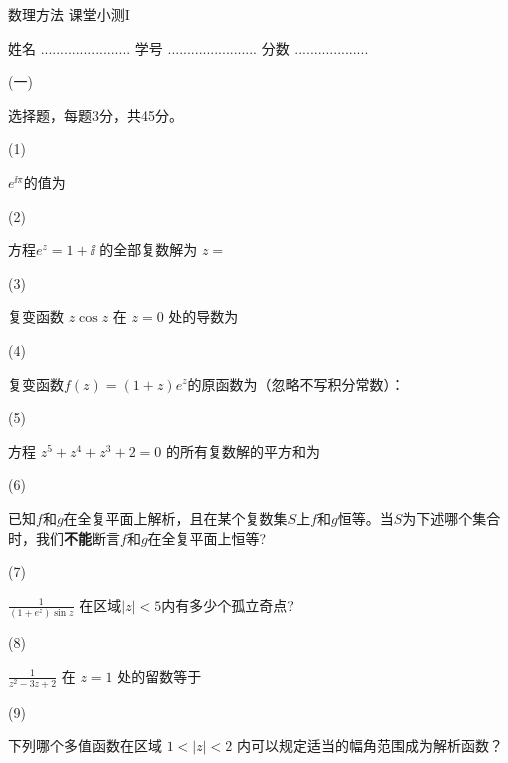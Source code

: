 \documentclass[12pt,CJK]{article}
\begin{document}
\bch
{\large 数理方法 课堂小测I}

{\vskip 0.2in}

姓名 ....................... {\hskip 0.5in}    学号 .......................{\hskip 0.5in}  分数 ...................

\bitem
\item[(一)]{选择题，每题3分，共45分。

  \bitem
\item[(1)]{ $e^{\ii \pi}$的值为  \bropt
  
   }
\item[(2)]{方程$e^z = 1 +\ii$ 的全部复数解为 $z=$ \bropt


}


\item[(3)]{复变函数 $z\cos z$ 在 $z=0$ 处的导数为 \bropt
  
  }

\item[(4)]{复变函数$f(z) = (1+z)e^z$的原函数为（忽略不写积分常数）： \bropt

  }
\item[(5)]{方程 $z^5+ z^4+z^3+2=0$ 的所有复数解的平方和为 \bropt

  }  

\item[(6)]{已知$f$和$g$在全复平面上解析，且在某个复数集$S$上$f$和$g$恒等。当$S$为下述哪个集合时，我们{\bf 不能}断言$f$和$g$在全复平面上恒等? \bropt

  }
  
\item[(7)]{$\frac{1}{(1+e^z)\sin z}$ 在区域$|z|< 5 $内有多少个孤立奇点? \bropt
  
  }
\item[(8)]{$\frac{1}{z^2-3z+2}$ 在 $z=1$ 处的留数等于 \bropt

    }  

\item[(9)]{下列哪个多值函数在区域 $1<|z|<2$ 内可以规定适当的幅角范围成为解析函数？ \bropt

  }


}
\end{document}
